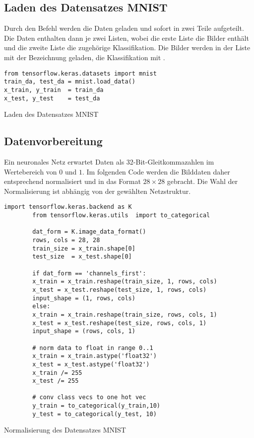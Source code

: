 \subsection{Laden des Datensatzes MNIST}

Durch den Befehl  werden die Daten geladen und sofort in zwei Teile aufgeteilt. Die Daten enthalten dann je zwei Listen, wobei die erste Liste die Bilder enthält und die zweite Liste die zugehörige Klassifikation. Die Bilder werden in der Liste mit der Bezeichnung  geladen,
die Klassifikation mit .

\medskip


\begin{code}
\begin{lstlisting}[numbers=none]
from tensorflow.keras.datasets import mnist
train_da, test_da = mnist.load_data()
x_train, y_train  = train_da
x_test, y_test    = test_da
\end{lstlisting}
    
\caption{Laden des Datensatzes MNIST}
\end{code}


\subsection{Datenvorbereitung}


Ein neuronales Netz erwartet Daten als 32-Bit-Gleitkommazahlen im Wertebereich von $0$ und $1$. Im folgenden Code werden die Bilddaten daher entsprechend normalisiert und in das Format $28 \times 28$ 
gebracht. Die Wahl der Normalisierung ist abhängig von der gewählten Netzstruktur.




\begin{code}
    \begin{lstlisting}[numbers=none]
        import tensorflow.keras.backend as K
        from tensorflow.keras.utils  import to_categorical
        
        dat_form = K.image_data_format()
        rows, cols = 28, 28
        train_size = x_train.shape[0]
        test_size  = x_test.shape[0]
        
        if dat_form == 'channels_first':
        x_train = x_train.reshape(train_size, 1, rows, cols)
        x_test = x_test.reshape(test_size, 1, rows, cols)
        input_shape = (1, rows, cols)
        else:
        x_train = x_train.reshape(train_size, rows, cols, 1)
        x_test = x_test.reshape(test_size, rows, cols, 1)
        input_shape = (rows, cols, 1)
        
        # norm data to float in range 0..1
        x_train = x_train.astype('float32')
        x_test = x_test.astype('float32')
        x_train /= 255
        x_test /= 255
        
        # conv class vecs to one hot vec
        y_train = to_categorical(y_train,10)
        y_test = to_categorical(y_test, 10)
    \end{lstlisting}
    
    \caption{Normalisierung des Datensatzes MNIST}
\end{code}


